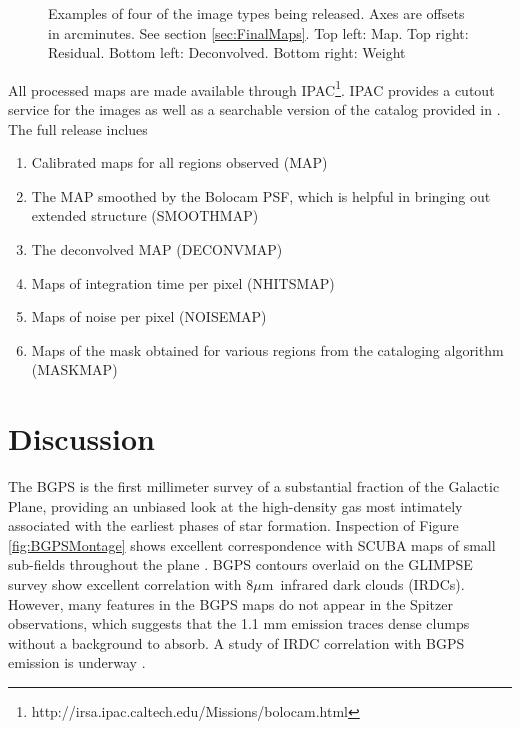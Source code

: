 \documentclass[12pt,preprint]{aastex}
\newcommand{\mum}{\ensuremath{\mu \mathrm{m}}}
\def\Figure#1#2#3#4{
\begin{figure}[htb]
\epsscale{#4}
\plotone{#1}
\caption{#2}
\label{#3}
\end{figure}
}
\begin{document}
\Figure{image_types}{Examples of four of the image types being released.  Axes are offsets
in arcminutes.  See section \ref{sec:FinalMaps}. Top
left: Map.  Top right: Residual.  Bottom left: Deconvolved.  Bottom right:
Weight}{fig:sampleimages}{1.0}


All processed maps are made available through
IPAC\footnote{http://irsa.ipac.caltech.edu/Missions/bolocam.html}.
IPAC provides a cutout service for the images as well as a searchable
version of the catalog provided in \citep{rosolowsky09}.  The full
release inclues
\begin{enumerate}
\item Calibrated maps for all regions observed (MAP)
\item The MAP smoothed by the Bolocam PSF, which is helpful in bringing out extended structure (SMOOTHMAP)
\item The deconvolved MAP (DECONVMAP)
\item Maps of integration time per pixel (NHITSMAP)
\item Maps of noise per pixel (NOISEMAP)
\item Maps of the mask obtained for various regions from the cataloging algorithm (MASKMAP)
\end{enumerate}


\section{Discussion}
\label{sec:Discussion}

The BGPS is the first millimeter survey of a substantial fraction
of the Galactic Plane, providing an unbiased look at the high-density
gas most intimately associated with the earliest phases of star
formation.  Inspection of Figure \ref{fig:BGPSMontage} shows excellent
correspondence with SCUBA maps of small sub-fields throughout the
plane \citep{difrancesco08}.  BGPS contours overlaid on the GLIMPSE
survey \citep{benjamin03} show excellent correlation with 8\mum\
infrared dark clouds (IRDCs).  However, many features in the BGPS maps
do not appear in the Spitzer observations, which suggests that the 1.1
mm emission traces dense clumps without a background to absorb.  A
study of IRDC correlation with BGPS emission is underway
\citep{battersby09}.
\end{document}
